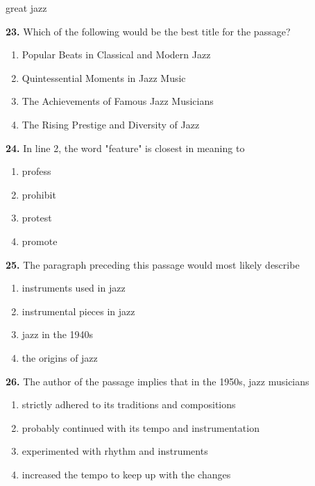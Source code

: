 \documentclass[12pt]{article}
\begin{document}
great jazz\par
\endgroup
\medskip
\noindent\textbf{23.} Which of the following would be the best title for the passage?
\begin{enumerate}[label=(\Alph*),leftmargin=*,itemsep=0.2em]
\item Popular Beats in Classical and Modern Jazz
\item Quintessential Moments in Jazz Music
\item The Achievements of Famous Jazz Musicians
\item The Rising Prestige and Diversity of Jazz
\end{enumerate}
\par
\vspace{0.25\baselineskip}
\noindent\textbf{24.} In line 2, the word "feature" is closest in meaning to
\begin{enumerate}[label=(\Alph*),leftmargin=*,itemsep=0.2em]
\item profess
\item prohibit
\item protest
\item promote
\end{enumerate}
\par
\vspace{0.25\baselineskip}
\noindent\textbf{25.} The paragraph preceding this passage would most likely describe
\begin{enumerate}[label=(\Alph*),leftmargin=*,itemsep=0.2em]
\item instruments used in jazz
\item instrumental pieces in jazz
\item jazz in the 1940s
\item the origins of jazz
\end{enumerate}
\par
\vspace{0.25\baselineskip}
\noindent\textbf{26.} The author of the passage implies that in the 1950s, jazz musicians
\begin{enumerate}[label=(\Alph*),leftmargin=*,itemsep=0.2em]
\item strictly adhered to its traditions and compositions
\item probably continued with its tempo and instrumentation
\item experimented with rhythm and instruments
\item increased the tempo to keep up with the changes
\end{enumerate}
\par
\end{document}
